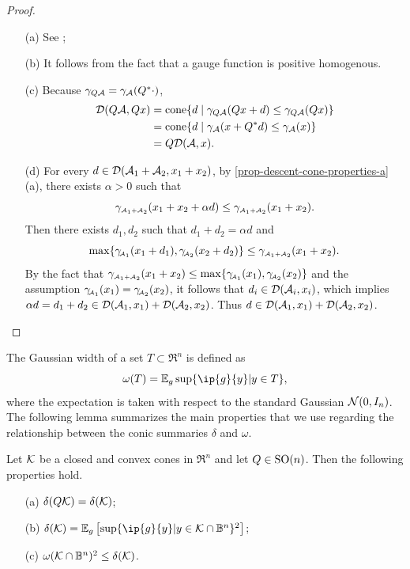 \begin{proof}
    \leavevmode
      \begin{itemize}
        \item[(a)] See \cite[Proposition 2.5]{mccoy2014sharp};
        \item[(b)] It follows from the fact that a gauge function is positive homogenous.  
        \item[(c)] Because $\gamma_{Q\mathcal{A}}=\gamma_{\mathcal{A}}(Q^*\cdot)$,
        \begin{align*}
          \mathcal{D}(Q\mathcal{A}, Qx) &= \operatorname{cone}\{d \mid \gamma_{Q\mathcal{A}}(Qx + d) \leq \gamma_{Q\mathcal{A}}(Qx)\}
          \\&= \operatorname{cone}\{d \mid \gamma_{\mathcal{A}}(x + Q^*d) \leq \gamma_{\mathcal{A}}(x)\}
          \\&= Q\mathcal{D}(\mathcal{A}, x).
        \end{align*}
        \item[(d)] 
        For every $d \in \mathcal{D}(\mathcal{A}_1 + \mathcal{A}_2, x_1 + x_2)$, by \autoref{prop-descent-cone-properties-a}(a), there exists $\alpha > 0$ such that  
        \[\gamma_{\scriptscriptstyle\mathcal{A}_1 + \scriptscriptstyle\mathcal{A}_2}(x_1 + x_2 + \alpha d) \leq \gamma_{\scriptscriptstyle\mathcal{A}_1 + \scriptscriptstyle\mathcal{A}_2}(x_1 + x_2).\] 
        Then there exists $d_1, d_2$ such that $d_1 + d_2 = \alpha d$ and 
        \[\max\{\gamma_{\!\scriptscriptstyle\mathcal{A}_1}(x_1 + d_1), \gamma_{\!\scriptscriptstyle\mathcal{A}_2}(x_2 + d_2)\} \leq \gamma_{\scriptscriptstyle\mathcal{A}_1 + \scriptscriptstyle\mathcal{A}_2}(x_1 + x_2).\]
        By the fact that $\gamma_{\scriptscriptstyle\mathcal{A}_1 + \scriptscriptstyle\mathcal{A}_2}(x_1 + x_2) \leq \max\{\gamma_{\!\scriptscriptstyle\mathcal{A}_1}(x_1), \gamma_{\!\scriptscriptstyle\mathcal{A}_2}(x_2)\}$ and the assumption $\gamma_{\!\scriptscriptstyle\mathcal{A}_1}(x_1) = \gamma_{\!\scriptscriptstyle\mathcal{A}_2}(x_2)$, it follows that $d_i \in \mathcal{D}(\mathcal{A}_i, x_i)$, which implies $\alpha d = d_1 + d_2 \in \mathcal{D}(\mathcal{A}_1, x_1) + \mathcal{D}(\mathcal{A}_2, x_2)$. Thus $d \in \mathcal{D}(\mathcal{A}_1, x_1) + \mathcal{D}(\mathcal{A}_2, x_2)$.
      \end{itemize}
\end{proof}

The Gaussian width of a set $T \subset \Re^n$ is defined as
\[\omega(T) = \mE_{g} \sup\{ \ip{g}{y} | y\in T\},\]
where the expectation is taken with respect to the standard Gaussian $\mathcal{N}(0,I_n)$. 
The following lemma summarizes the main properties that we use regarding the relationship between the conic summaries $\delta$ and $\omega$.

\begin{lemma}\label{prop:stat_dim}
    Let $\mathcal{K}$ be a closed and convex cones in $\Re^n$ and let $Q\in\operatorname{SO}(n)$. Then the following properties hold. 
    \begin{itemize}
      \item[(a)] \label{prop:stat_dim_a} $\delta(Q\mathcal{K}) = \delta(\mathcal{K})$;
      \item[(b)] \label{prop:stat_dim_b} $\delta(\Kscr) = \mE_g \left[\sup\{ \ip{g}{y} | y\in\Kscr\cap\mB^n\}^2\right]$;
      \item[(c)] \label{prop:stat_dim_c} $\omega(\mathcal{K}\cap\mathbb{B}^n)^2 \leq \delta(\mathcal{K})$.
    \end{itemize}
\end{lemma}

